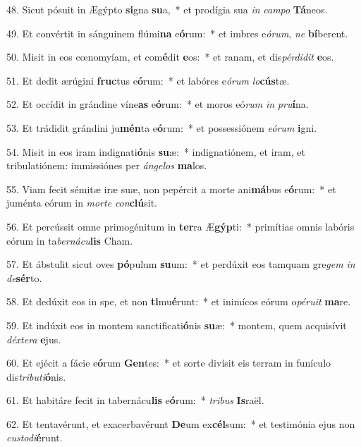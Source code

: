 48. Sicut pósuit in Ægýpto \textbf{si}gna \textbf{su}a,~*  et prodígia sua \textit{in} \textit{cam}\textit{po} \textbf{Tá}neos.\

49. Et convértit in sánguinem flúmi\textbf{na} e\textbf{ó}rum:~*  et imbres e\textit{ó}\textit{rum}, \textit{ne} \textbf{bí}berent.\

50. Misit in eos cœnomyíam, et com\textbf{é}dit \textbf{e}os:~*  et ranam, et dis\textit{pér}\textit{di}\textit{dit} \textbf{e}os.\

51. Et dedit ærúgini \textbf{fruc}tus e\textbf{ó}rum:~*  et labóres e\textit{ó}\textit{rum} \textit{lo}\textbf{cús}tæ.\

52. Et occídit in grándine víne\textbf{as} e\textbf{ó}rum:~*  et moros eó\textit{rum} \textit{in} \textit{pru}\textbf{í}na.\

53. Et trádidit grándini ju\textbf{mén}ta e\textbf{ó}rum:~*  et possessiónem \textit{e}\textit{ó}\textit{rum} \textbf{i}gni.\

54. Misit in eos iram indignati\textbf{ó}nis \textbf{su}æ:~*  indignatiónem, et iram, et tribulatiónem: immissiónes per \textit{án}\textit{ge}\textit{los} \textbf{ma}los.\

55. Viam fecit sémitæ iræ suæ, non pepércit a morte ani\textbf{má}bus e\textbf{ó}rum:~*  et juménta eórum in \textit{mor}\textit{te} \textit{con}\textbf{clú}sit.\

56. Et percússit omne primogénitum in \textbf{ter}ra Æ\textbf{gýp}ti:~*  primítias omnis labóris eórum in ta\textit{ber}\textit{ná}\textit{cu}\textbf{lis} Cham.\

57. Et ábstulit sicut oves \textbf{pó}pulum \textbf{su}um:~*  et perdúxit eos tamquam gre\textit{gem} \textit{in} \textit{de}\textbf{sér}to.\

58. Et dedúxit eos in spe, et non \textbf{ti}mu\textbf{é}runt:~*  et inimícos eórum o\textit{pé}\textit{ru}\textit{it} \textbf{ma}re.\

59. Et indúxit eos in montem sanctificati\textbf{ó}nis \textbf{su}æ:~*  montem, quem acquisívit \textit{déx}\textit{te}\textit{ra} \textbf{e}jus.\

60. Et ejécit a fácie e\textbf{ó}rum \textbf{Gen}tes:~*  et sorte divísit eis terram in funículo dis\textit{tri}\textit{bu}\textit{ti}\textbf{ó}nis.\

61. Et habitáre fecit in tabernácu\textbf{lis} e\textbf{ó}rum:~*  \textit{tri}\textit{bus} \textbf{Is}raël.\

62. Et tentavérunt, et exacerbavérunt \textbf{De}um ex\textbf{cél}sum:~*  et testimónia ejus non \textit{cus}\textit{to}\textit{di}\textbf{é}runt.\

